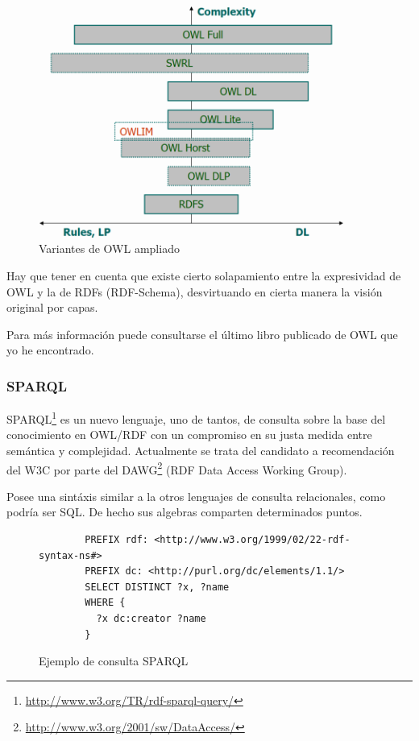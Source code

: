 \begin{figure}[ht]
	\centering
	\includegraphics[width=10cm]{images/owl-dialects.png}
	\caption{Variantes de OWL ampliado}
	\label{fig:owlVariantsExtended}
\end{figure}

Hay que tener en cuenta que existe cierto solapamiento entre la expresividad de
OWL y la de RDFs (RDF-Schema), desvirtuando en cierta manera la visión original
por capas.

Para más información puede consultarse el último libro publicado de OWL\cite{OWL} 
que yo he encontrado.

\subsubsection{SPARQL}

SPARQL\footnote{\url{http://www.w3.org/TR/rdf-sparql-query/}} es un nuevo lenguaje,
uno de tantos\cite{ComparisonRDFQuery}, de consulta sobre la base del conocimiento 
en OWL/RDF con un compromiso en su justa medida entre semántica y 
complejidad\cite{SemanticsComplexitySPARQL}. Actualmente se trata del candidato a 
recomendación del W3C por parte del 
DAWG\footnote{\url{http://www.w3.org/2001/sw/DataAccess/}} (RDF Data Access Working 
Group).

Posee una sintáxis similar a la otros lenguajes de consulta relacionales, como
podría ser SQL. De hecho sus algebras comparten\cite{RelationalAlgebraSPARQL} 
determinados puntos. 

\begin{figure}[ht]
	\begin{verbatim}
		PREFIX rdf: <http://www.w3.org/1999/02/22-rdf-syntax-ns#>
		PREFIX dc: <http://purl.org/dc/elements/1.1/>
		SELECT DISTINCT ?x, ?name
		WHERE {
		  ?x dc:creator ?name
		}
	\end{verbatim}
	\centering
	\caption{Ejemplo de consulta SPARQL}
	\label{fig:ejemplo.sparql}
\end{figure}


